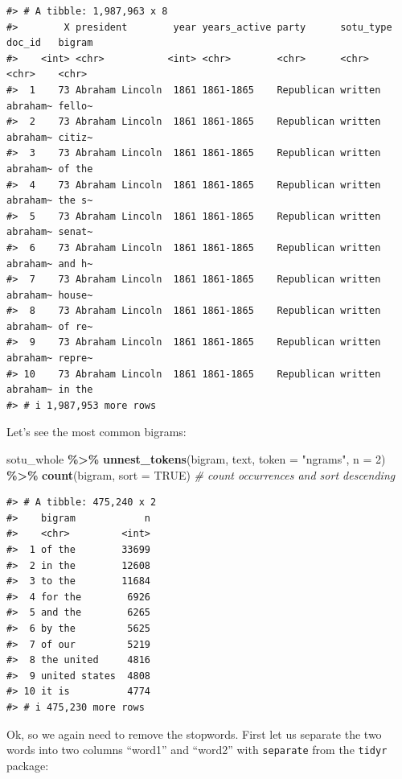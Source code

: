 \documentclass[
]{book}
\newenvironment{Shaded}{\begin{snugshade}}{\end{snugshade}}
\newcommand{\AttributeTok}[1]{\textcolor[rgb]{0.13,0.29,0.53}{#1}}
\newcommand{\CommentTok}[1]{\textcolor[rgb]{0.56,0.35,0.01}{\textit{#1}}}
\newcommand{\ConstantTok}[1]{\textcolor[rgb]{0.56,0.35,0.01}{#1}}
\newcommand{\DecValTok}[1]{\textcolor[rgb]{0.00,0.00,0.81}{#1}}
\newcommand{\FunctionTok}[1]{\textcolor[rgb]{0.13,0.29,0.53}{\textbf{#1}}}
\newcommand{\NormalTok}[1]{#1}
\newcommand{\SpecialCharTok}[1]{\textcolor[rgb]{0.81,0.36,0.00}{\textbf{#1}}}
\newcommand{\StringTok}[1]{\textcolor[rgb]{0.31,0.60,0.02}{#1}}
\begin{document}
\begin{verbatim}
#> # A tibble: 1,987,963 x 8
#>        X president        year years_active party      sotu_type doc_id   bigram
#>    <int> <chr>           <int> <chr>        <chr>      <chr>     <chr>    <chr> 
#>  1    73 Abraham Lincoln  1861 1861-1865    Republican written   abraham~ fello~
#>  2    73 Abraham Lincoln  1861 1861-1865    Republican written   abraham~ citiz~
#>  3    73 Abraham Lincoln  1861 1861-1865    Republican written   abraham~ of the
#>  4    73 Abraham Lincoln  1861 1861-1865    Republican written   abraham~ the s~
#>  5    73 Abraham Lincoln  1861 1861-1865    Republican written   abraham~ senat~
#>  6    73 Abraham Lincoln  1861 1861-1865    Republican written   abraham~ and h~
#>  7    73 Abraham Lincoln  1861 1861-1865    Republican written   abraham~ house~
#>  8    73 Abraham Lincoln  1861 1861-1865    Republican written   abraham~ of re~
#>  9    73 Abraham Lincoln  1861 1861-1865    Republican written   abraham~ repre~
#> 10    73 Abraham Lincoln  1861 1861-1865    Republican written   abraham~ in the
#> # i 1,987,953 more rows
\end{verbatim}

Let's see the most common bigrams:

\begin{Shaded}
\begin{Highlighting}[]
\NormalTok{sotu\_whole }\SpecialCharTok{\%\textgreater{}\%}
  \FunctionTok{unnest\_tokens}\NormalTok{(bigram, text, }\AttributeTok{token =} \StringTok{"ngrams"}\NormalTok{, }\AttributeTok{n =} \DecValTok{2}\NormalTok{) }\SpecialCharTok{\%\textgreater{}\%} 
  \FunctionTok{count}\NormalTok{(bigram, }\AttributeTok{sort =} \ConstantTok{TRUE}\NormalTok{) }\CommentTok{\# count occurrences and sort descending}
\end{Highlighting}
\end{Shaded}

\begin{verbatim}
#> # A tibble: 475,240 x 2
#>    bigram            n
#>    <chr>         <int>
#>  1 of the        33699
#>  2 in the        12608
#>  3 to the        11684
#>  4 for the        6926
#>  5 and the        6265
#>  6 by the         5625
#>  7 of our         5219
#>  8 the united     4816
#>  9 united states  4808
#> 10 it is          4774
#> # i 475,230 more rows
\end{verbatim}

Ok, so we again need to remove the stopwords. First let us separate the two words into two columns ``word1'' and ``word2'' with \texttt{separate} from the \texttt{tidyr} package:
\end{document}
